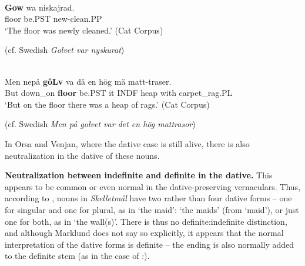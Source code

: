

\ea\label{}
\\
\gll	\textbf{Gow} wa  niskajrad.\\
		floor  be.PST  new-clean.PP\\
\glt 	‘The floor was newly cleaned.’ (Cat Corpus)

\z

(cf. Swedish \textit{Golvet var nyskurat}) 




\ea\label{}
\\
\gll	Men  nepå  \textbf{gôLv} va  dä  en  hög  mä  matt-traser.\\
		But  down\_on  \textbf{floor} be.PST  it  INDF  heap  with  carpet\_rag.PL\\
\glt	‘But on the floor there was a heap of rags.’ (Cat Corpus)

\z

(cf. Swedish \textit{Men på golvet var det en hög mattrasor})


In Orsa and Venjan, where the dative case is still alive, there is also neutralization in the dative of these nouns. 


\textbf{Neutralization between indefinite and definite in the dative.} This appears to be common or even normal in the dative-preserving vernaculars. Thus, according to \citet{Marklund1976}, nouns in \textit{Skelletmål} have two rather than four dative forms – one for singular and one for plural, as in  ‘the maid’:  ‘the maids’ (from  ‘maid’), or just one for both, as in ‘the wall(s)’. There is thus no definite:indefinite distinction, and although Marklund does not say so explicitly, it appears that the normal interpretation of the dative forms is definite – the ending is also normally added to the definite stem (as in the case of :).

